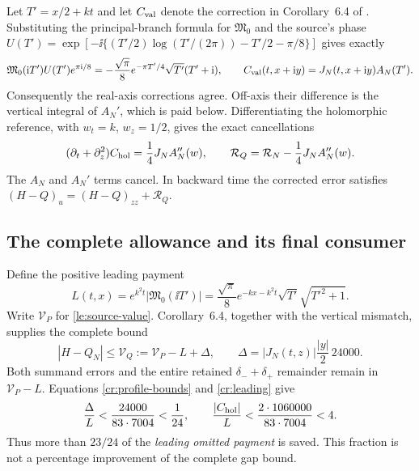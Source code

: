 Let $T'=x/2+kt$ and let $C_{\rm val}$ denote the correction in
Corollary~6.4 of \cite{Polymath2019}. Substituting the principal-branch
formula for $\mathfrak M_0$ and the source's phase
$U(T')=\exp[-\ii\{(T'/2)\log(T'/(2\pi))-T'/2-\pi/8\}]$
gives exactly
\begin{equation}
 \mathfrak M_0(\mathrm i T')U(T')e^{\pi\mathrm i/8}
 =-\frac{\sqrt\pi}{8}e^{-\pi T'/4}\sqrt{T'}(T'+\mathrm i),
 \qquad C_{\rm val}(t,x+\mathrm i y)=J_N(t,x+\mathrm i y)A_N(T').
 \label{cr:phase}
\end{equation}
Consequently the real-axis corrections agree. Off-axis their difference
is the vertical integral of $A_N'$, which is paid below. Differentiating
the holomorphic reference, with $w_t=k$, $w_z=1/2$, gives the exact
cancellations
\begin{equation}
 (\partial_t+\partial_z^2)C_{\rm hol}
       =\frac14J_NA_N''(w),\qquad
 \mathcal R_Q=\mathcal R_N-\frac14J_NA_N''(w).
 \label{cr:defect}
\end{equation}
The $A_N$ and $A_N'$ terms cancel. In backward time the corrected
error satisfies $(H-Q)_u=(H-Q)_{zz}+\mathcal R_Q$.

\subsection{The complete allowance and its final consumer}

Define the positive leading payment
\begin{equation}
 L(t,x)=e^{k^2t}|\mathfrak M_0(\ii T')|
       =\frac{\sqrt\pi}{8}e^{-kx-k^2t}
                              \sqrt{T'}\sqrt{T'^2+1}.
 \label{cr:leading}
\end{equation}
Write $\mathcal V_P$ for \eqref{le:source-value}. Corollary~6.4,
together with the vertical mismatch, supplies the complete bound
\begin{equation}
 |H-Q_N|\le\mathcal V_Q
 :=\mathcal V_P-L+\Delta,\qquad
 \Delta=|J_N(t,z)|\frac{|y|}{2}\,24000.
 \label{cr:source}
\end{equation}
Both summand errors and the entire retained $\delta_-+\delta_+$
remainder remain in $\mathcal V_P-L$. Equations
\eqref{cr:profile-bounds} and \eqref{cr:leading} give
\begin{equation}
 \frac{\Delta}{L}<\frac{24000}{83\cdot7004}<\frac1{24},
 \qquad \frac{|C_{\rm hol}|}{L}
       <\frac{2\cdot1060000}{83\cdot7004}<4.
 \label{cr:saving}
\end{equation}
Thus more than $23/24$ of the \emph{leading omitted payment} is saved.
This fraction is not a percentage improvement of the complete gap bound.

